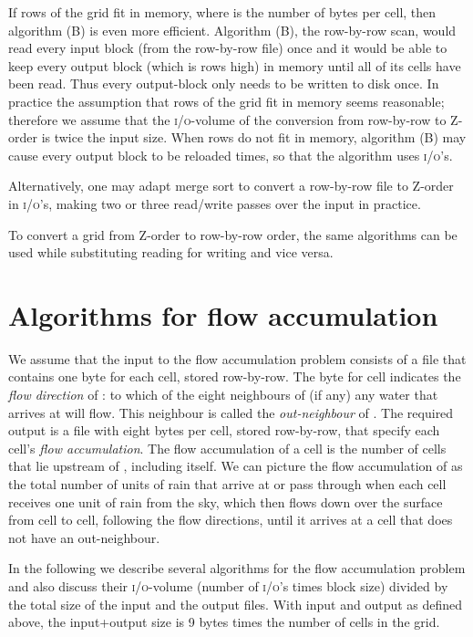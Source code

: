 \documentclass[10pt,a4paper]{article}
\def\io{\textsc{i/o}\xspace}
\def\ios{\textsc{i/o}'s\xspace}
\begin{document}
If  rows of the grid fit in memory, where  is the number of bytes per cell, then algorithm (B) is even more efficient. Algorithm (B), the row-by-row scan, would read every input block (from the row-by-row file) once and it would be able to keep every output block (which is  rows high) in memory until all of its cells have been read. Thus every output-block only needs to be written to disk once. In practice the assumption that  rows of the grid fit in memory seems reasonable; therefore we assume that the \io-volume of the conversion from row-by-row to Z-order is twice the input size. When  rows do not fit in memory, algorithm (B) may cause every output block to be reloaded  times, so that the algorithm uses  \ios.

Alternatively, one may adapt merge sort to convert a row-by-row file to Z-order in  \ios, making two or three read/write passes over the input in practice.

To convert a grid from Z-order to row-by-row order, the same algorithms can be used while substituting reading for writing and vice versa.

\section{Algorithms for flow accumulation}

We assume that the input to the flow accumulation problem consists of a file  that contains one byte for each cell, stored row-by-row. The byte for cell  indicates the \emph{flow direction} of : to which of the eight neighbours of  (if any) any water that arrives at  will flow. This neighbour is called the \emph{out-neighbour} of . The required output is a file  with eight bytes per cell, stored row-by-row, that specify each cell's \emph{flow accumulation}. The flow accumulation of a cell  is the number of cells that lie upstream of , including  itself. We can picture the flow accumulation of  as the total number of units of rain that arrive at or pass through  when each cell receives one unit of rain from the sky, which then flows down over the surface from cell to cell, following the flow directions, until it arrives at a cell that does not have an out-neighbour.

In the following we describe several algorithms for the flow accumulation problem and also discuss their \io-volume (number of \ios times block size) divided by the total size of the input and the output files. With input and output as defined above, the input+output size is 9 bytes times the number of cells in the grid.
\end{document}
